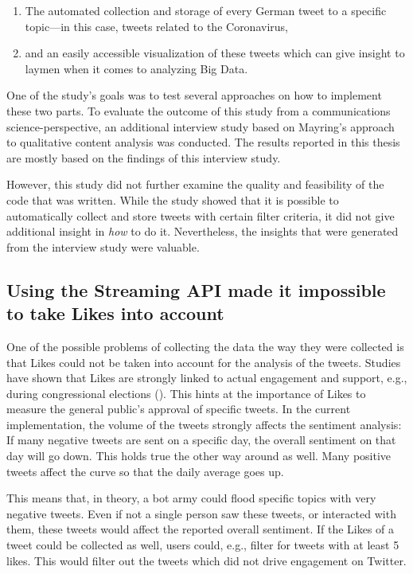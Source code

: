 \begin{enumerate}
    \item The automated collection and storage of every German tweet to a specific topic---in this case, tweets related to the Coronavirus,
    \item and an easily accessible visualization of these tweets which can give insight to laymen when it comes to analyzing Big Data.
\end{enumerate}

One of the study's goals was to test several approaches on how to implement these two parts. To evaluate the outcome of this study from a communications science-perspective, an additional interview study based on Mayring's approach to qualitative content analysis was conducted. The results reported in this thesis are mostly based on the findings of this interview study.

However, this study did not further examine the quality and feasibility of the code that was written. While the study showed that it is possible to automatically collect and store tweets with certain filter criteria, it did not give additional insight in \emph{how} to do it. Nevertheless, the insights that were generated from the interview study were valuable.

\subsection*{Using the Streaming API made it impossible to take Likes into account}
One of the possible problems of collecting the data the way they were collected is that Likes could not be taken into account for the analysis of the tweets. Studies have shown that Likes are strongly linked to actual engagement and support, e.g., during congressional elections (\cite{macwilliamsForecastingCongressionalElections2015}). This hints at the importance of Likes to measure the general public's approval of specific tweets. In the current implementation, the volume of the tweets strongly affects the sentiment analysis: If many negative tweets are sent on a specific day, the overall sentiment on that day will go down. This holds true the other way around as well. Many positive tweets affect the curve so that the daily average goes up.

This means that, in theory, a bot army could flood specific topics with very negative tweets. Even if not a single person saw these tweets, or interacted with them, these tweets would affect the reported overall sentiment. If the Likes of a tweet could be collected as well, users could, e.g., filter for tweets with at least 5 likes. This would filter out the tweets which did not drive engagement on Twitter.

